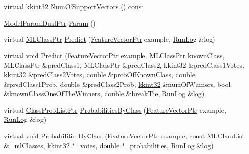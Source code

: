 \begin{DoxyCompactItemize}
\item 
virtual \hyperlink{namespace_k_k_b_a8fa4952cc84fda1de4bec1fbdd8d5b1b}{kkint32} \hyperlink{class_k_k_m_l_l_1_1_model_dual_a0a70bcdfaa64d31dcb48da95ad5b9f62}{Num\+Of\+Support\+Vectors} () const 
\item 
\hyperlink{namespace_k_k_m_l_l_ac0d00af7c9dc9b90ef0ce1a91ccd1c40}{Model\+Param\+Dual\+Ptr} \hyperlink{class_k_k_m_l_l_1_1_model_dual_a66abadaf77afb87ba43d8aad58d4098f}{Param} ()
\item 
virtual \hyperlink{namespace_k_k_m_l_l_ac272393853d59e72e8456f14cd6d8c23}{M\+L\+Class\+Ptr} \hyperlink{class_k_k_m_l_l_1_1_model_dual_a962c786e5b22cd2ab856f3554200cda3}{Predict} (\hyperlink{namespace_k_k_m_l_l_a0c5df3d48f45926fbc4fee04f5e3bc04}{Feature\+Vector\+Ptr} example, \hyperlink{class_k_k_b_1_1_run_log}{Run\+Log} \&log)
\item 
virtual void \hyperlink{class_k_k_m_l_l_1_1_model_dual_a7fbbf876aa795e6628025d9ac60ed834}{Predict} (\hyperlink{namespace_k_k_m_l_l_a0c5df3d48f45926fbc4fee04f5e3bc04}{Feature\+Vector\+Ptr} example, \hyperlink{namespace_k_k_m_l_l_ac272393853d59e72e8456f14cd6d8c23}{M\+L\+Class\+Ptr} known\+Class, \hyperlink{namespace_k_k_m_l_l_ac272393853d59e72e8456f14cd6d8c23}{M\+L\+Class\+Ptr} \&pred\+Class1, \hyperlink{namespace_k_k_m_l_l_ac272393853d59e72e8456f14cd6d8c23}{M\+L\+Class\+Ptr} \&pred\+Class2, \hyperlink{namespace_k_k_b_a8fa4952cc84fda1de4bec1fbdd8d5b1b}{kkint32} \&pred\+Class1\+Votes, \hyperlink{namespace_k_k_b_a8fa4952cc84fda1de4bec1fbdd8d5b1b}{kkint32} \&pred\+Class2\+Votes, double \&prob\+Of\+Known\+Class, double \&pred\+Class1\+Prob, double \&pred\+Class2\+Prob, \hyperlink{namespace_k_k_b_a8fa4952cc84fda1de4bec1fbdd8d5b1b}{kkint32} \&num\+Of\+Winners, bool \&known\+Class\+One\+Of\+The\+Winners, double \&break\+Tie, \hyperlink{class_k_k_b_1_1_run_log}{Run\+Log} \&log)
\item 
virtual \hyperlink{namespace_k_k_m_l_l_a60f96a524ddb189eff2b4391cf0b651c}{Class\+Prob\+List\+Ptr} \hyperlink{class_k_k_m_l_l_1_1_model_dual_a4a97163711b65040f355a126e60a99bf}{Probabilities\+By\+Class} (\hyperlink{namespace_k_k_m_l_l_a0c5df3d48f45926fbc4fee04f5e3bc04}{Feature\+Vector\+Ptr} example, \hyperlink{class_k_k_b_1_1_run_log}{Run\+Log} \&log)
\item 
virtual void \hyperlink{class_k_k_m_l_l_1_1_model_dual_a62801b539d71f3154268805c3a83c750}{Probabilities\+By\+Class} (\hyperlink{namespace_k_k_m_l_l_a0c5df3d48f45926fbc4fee04f5e3bc04}{Feature\+Vector\+Ptr} example, const \hyperlink{class_k_k_m_l_l_1_1_m_l_class_list}{M\+L\+Class\+List} \&\+\_\+ml\+Classes, \hyperlink{namespace_k_k_b_a8fa4952cc84fda1de4bec1fbdd8d5b1b}{kkint32} $\ast$\+\_\+votes, double $\ast$\+\_\+probabilities, \hyperlink{class_k_k_b_1_1_run_log}{Run\+Log} \&log)

\end{DoxyCompactItemize}
